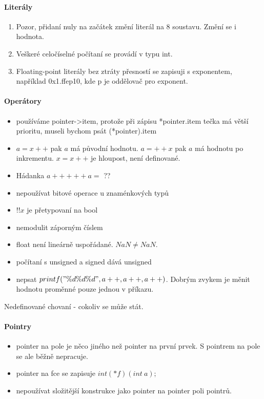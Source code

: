 \paragraph{Literály}
\begin{enumerate}
	\item Pozor, přidaní nuly na začátek změní literál na 8 soustavu.
		Změní se i hodnota.
	\item Veškeré celočíselné počítaní se provádí v typu int.
	\item Floating-point literály bez ztráty přesností se zapisuji s exponentem, například 0x1.ffep10, kde p je oddělovač pro exponent.
\end{enumerate}

\paragraph{Operátory}
\begin{itemize}
	\item používáme pointer->item, protože při zápisu *pointer.item tečka má větší prioritu, museli bychom psát (*pointer).item
	\item $a = x++$ pak $a$ má původní hodnotu. $a = ++x$ pak $a$ má hodnotu po inkrementu.
		$x = x++$ je hloupost, není definované.
	\item Hádanka $a+++++a = $ ??
	\item nepoužívat bitové operace u znaménkových typů
	\item $!!x$ je přetypovaní na bool
	\item nemodulit záporným číslem
	\item float není lineárně uspořádané. $NaN \ne NaN$.
	\item počítaní s unsigned a signed dává unsigned
	\item nepsat $printf("\%d \%d \%d", a++, a++, a++)$.
		Dobrým zvykem je měnit hodnotu proměnné pouze jednou v příkazu.
\end{itemize}

Nedefinované chovaní - cokoliv se může stát.

\paragraph{Pointry}
\begin{itemize}
	\item pointer na pole je něco jiného než pointer na první prvek. S pointrem na pole se ale běžně nepracuje.
	\item pointer na fce se zapisuje $int (*f)(int\ a);$
	\item nepoužívat složitější konstrukce jako pointer na pointer poli pointrů.
\end{itemize}

